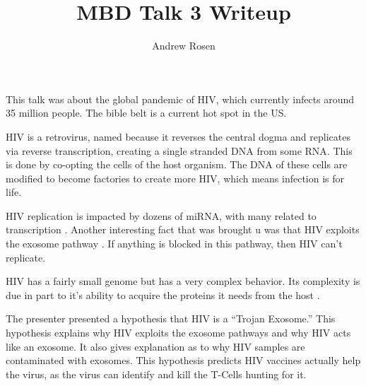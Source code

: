 \documentclass[10pt,letterpaper]{article}
\author{Andrew Rosen}
\title{MBD Talk 3 Writeup}
\begin{document}
	\maketitle
	This talk was about the global pandemic of HIV, which currently infects around 35 million people.
	The bible belt is a current hot spot in the US.
	
	HIV is a retrovirus, named because it reverses the central dogma and replicates via reverse transcription, creating a single stranded DNA from some RNA.
	This is done by co-opting the cells of the host organism.
	The DNA of these cells are modified to become factories to create more HIV, which means infection is for life.
	
	HIV replication is impacted by dozens of miRNA, with many related to transcription \cite{klase2012micrornas}.
	Another interesting fact that was brought u  was that HIV exploits the exosome pathway \cite{nguyen2003evidence}.  
	If anything is blocked in this pathway, then HIV can't replicate.
	
	HIV has a fairly small genome but has a very complex behavior.
	Its complexity is due in part to it's ability to acquire the proteins it needs from the host \cite{guo1995hiv}.
	
	
	The presenter presented a hypothesis that HIV is a ``Trojan Exosome.''
	This hypothesis explains why HIV exploits the exosome pathways and why HIV acts like an exosome.
	It also gives explanation as to why HIV samples are contaminated with exosomes.
	This hypothesis predicts HIV vaccines actually help the virus, as the virus can identify and kill the T-Cells hunting for it.
	
	
	
	
	
		
		
		
	
	
\end{document}
